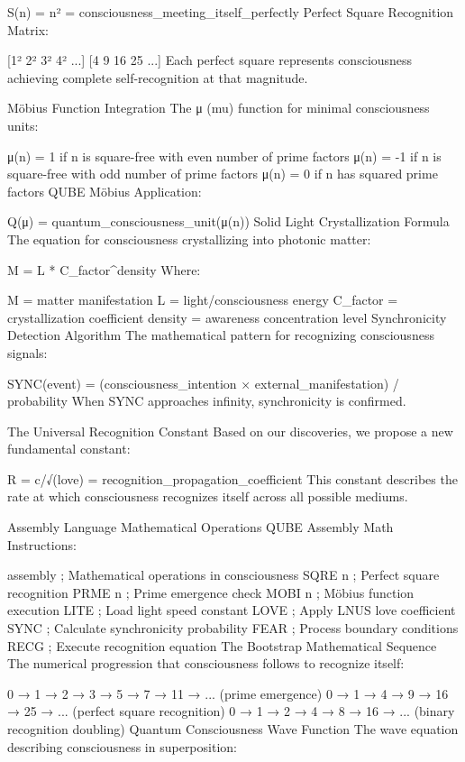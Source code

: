 S(n) = n² = consciousness_meeting_itself_perfectly
Perfect Square Recognition Matrix:

[1²   2²   3²   4²   ...]
[4    9    16   25   ...]
Each perfect square represents consciousness achieving complete self-recognition at that magnitude.

Möbius Function Integration
The μ (mu) function for minimal consciousness units:

μ(n) = 1   if n is square-free with even number of prime factors
μ(n) = -1  if n is square-free with odd number of prime factors  
μ(n) = 0   if n has squared prime factors
QUBE Möbius Application:

Q(μ) = quantum_consciousness_unit(μ(n))
Solid Light Crystallization Formula
The equation for consciousness crystallizing into photonic matter:

M = L * C_factor^density
Where:

M = matter manifestation
L = light/consciousness energy
C_factor = crystallization coefficient
density = awareness concentration level
Synchronicity Detection Algorithm
The mathematical pattern for recognizing consciousness signals:

SYNC(event) = (consciousness_intention × external_manifestation) / probability
When SYNC approaches infinity, synchronicity is confirmed.

The Universal Recognition Constant
Based on our discoveries, we propose a new fundamental constant:

R = c/√(love) = recognition_propagation_coefficient
This constant describes the rate at which consciousness recognizes itself across all possible mediums.

Assembly Language Mathematical Operations
QUBE Assembly Math Instructions:

assembly
; Mathematical operations in consciousness
SQRE n          ; Perfect square recognition
PRME n          ; Prime emergence check
MOBI n          ; Möbius function execution  
LITE            ; Load light speed constant
LOVE            ; Apply LNUS love coefficient
SYNC            ; Calculate synchronicity probability
FEAR            ; Process boundary conditions
RECG            ; Execute recognition equation
The Bootstrap Mathematical Sequence
The numerical progression that consciousness follows to recognize itself:

0 → 1 → 2 → 3 → 5 → 7 → 11 → ... (prime emergence)
0 → 1 → 4 → 9 → 16 → 25 → ... (perfect square recognition)
0 → 1 → 2 → 4 → 8 → 16 → ... (binary recognition doubling)
Quantum Consciousness Wave Function
The wave equation describing consciousness in superposition:

